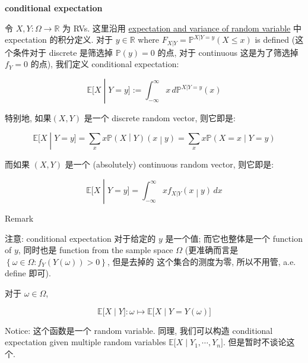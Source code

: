 \documentclass{qlnotes-export}
\begin{document}
\begin{definition}{\protect{}\label{kn-conditional-expectation}{\textbf{conditional
expectation}}}\label{def-03-joint-conditional-distribution-conditional-expectation}

令 \(X,Y:\Omega\rightarrow{\mathbb{R}}\) 为 RVs. 这里沿用 \href{https://qiulinfan.github.io/notes/math/probability/\#kn-expectation-and-variance-of-random-variable}{expectation and variance of random variable} 中 expectation 的积分定义. 对于 \(y \in {\mathbb{R}}\) where \(F_{X|Y} = {\mathbb{P}}^{X|Y = y}(X \leq x)\) is defined (这个条件对于 discrete 是筛选掉 \({\mathbb{P}}(y) = 0\) 的点, 对于 continuous 这是为了筛选掉 \(f_{Y} = 0\) 的点), 我们定义 conditional expectation:

\[\left. {\mathbb{E}}\lbrack X \middle| Y = y\rbrack := \int_{- \infty}^{\infty}x\, d{\mathbb{P}}^{X|Y = y}(x) \right.\]

特别地, 如果\((X,Y)\) 是一个 discrete random vector, 则它即是:

\[\left. {\mathbb{E}}\lbrack X \middle| Y = y\rbrack = \sum\limits_{x}x{\mathbb{P}}(X \middle| Y)(x \middle| y) = \sum\limits_{x}x{\mathbb{P}}(X = x \middle| Y = y) \right.\]

而如果 \((X,Y)\) 是一个 (absolutely) continuous random vector, 则它即是:

\[\left. {\mathbb{E}}\lbrack X \middle| Y = y\rbrack = \int_{- \infty}^{\infty}xf_{X|Y}(x \middle| y)\, dx \right.\]

\end{definition}

\begin{qlremark}{Remark}

注意: conditional expectation 对于给定的 \(y\) 是一个值; 而它也整体是一个 function of \(y\), 同时也是 function from the sample space \(\Omega\) (更准确而言是 \(\left\{ {\omega \in \Omega:f_{Y}(Y(\omega)) > 0} \right\}\), 但是去掉的 这个集合的测度为零, 所以不用管, a.e. define 即可).

对于 \(\omega \in \Omega\),

\[\left. {\mathbb{E}}\lbrack X \middle| Y\rbrack:\omega\mapsto{\mathbb{E}}\lbrack X \middle| Y = Y(\omega)\rbrack \right.\]

Notice: 这个函数是一个 random variable. 同理, 我们可以构造 conditional expectation given multiple random variables \(\left. {\mathbb{E}}\lbrack X \middle| Y_{1},\cdots,Y_{n}\rbrack \right.\). 但是暂时不谈论这个.

\end{qlremark}
\end{document}
